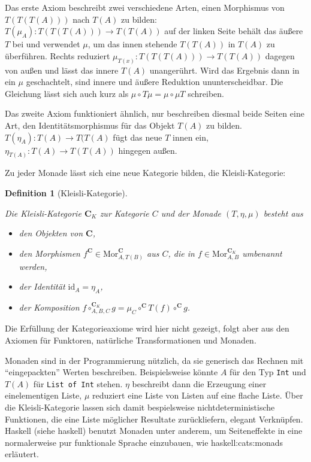 \documentclass[11pt, a4paper, bibgerm]{scrbook}
\newcommand\icode[1]{\lstinline?#1?}
\newcommand\cref{}
\newcommand\sref{}
\newcommand\ato{\rightarrow} %
\newtheorem{defini}{Definition}
\newcommand{\defi}[2]{%
  \begin{defini}[#1]
    \label{def:#1}
    #2
  \end{defini}
}
\newcommand{\seec}[1]{(siehe \cref{#1})}
\begin{document}
Das erste Axiom beschreibt zwei verschiedene Arten, einen Morphismus von
$T(T(T(A)))$ nach $T(A)$ zu bilden: $T(\mu_A):T(T(T(A))) \ato T(T(A))$
auf der linken Seite behält das äußere $T$ bei und verwendet $\mu$, um
das innen stehende $T(T(A))$ in $T(A)$ zu überführen. Rechts reduziert
$\mu_{T(x)}:T(T(T(A))) \ato T(T(A))$ dagegen von außen und lässt das
innere $T(A)$ unangerührt. Wird das Ergebnis dann in ein $\mu$
geschachtelt, sind innere und äußere Reduktion ununterscheidbar. Die
Gleichung lässt sich auch kurz als $\mu \circ T \mu = \mu \circ \mu T$
schreiben.

Das zweite Axiom funktioniert ähnlich, nur beschreiben diesmal beide
Seiten eine Art, den Identitätsmorphismus für das Objekt $T(A)$ zu
bilden. $T(\eta_A):T(A) \ato T(T(A)$ fügt das neue $T$ innen ein,
$\eta_{T(A)}:T(A) \ato T(T(A))$ hingegen außen.

Zu jeder Monade lässt sich eine neue Kategorie bilden, die Kleisli-Kategorie:
\defi{Kleisli-Kategorie}{
Die Kleisli-Kategorie $\mathbf{C}_K$ zur Kategorie $C$ und der
Monade $(T,\eta,\mu)$ besteht aus
\begin{itemize}
\item den Objekten von $\mathbf{C}$,
\item den Morphismen $f^{\mathbf{C}} \in
  \mathrm{Mor}^{\mathbf{C}}_{A,T(B)}$ aus $C$, die in $f \in
  \mathrm{Mor}^{\mathbf{C}_K}_{A,B}$ umbenannt werden,
\item der Identität $\mathrm{id}_A = \eta_A$,
\item der Komposition $f \circ^{\mathbf{C}_K}_{A,B,C} g = \mu_C
  \circ^{\mathbf{C}} T(f) \circ^{\mathbf{C}} g$.
\end{itemize}
}
Die Erfüllung der Kategorieaxiome wird hier nicht gezeigt, folgt aber
aus den Axiomen für Funktoren, natürliche Transformationen und Monaden.

Monaden sind in der Programmierung nützlich, da sie generisch das
Rechnen mit "`eingepackten"' Werten beschreiben. Beispielsweise könnte
$A$ für den Typ \icode{Int} und $T(A)$ für \icode{List of Int}
stehen. $\eta$ beschreibt dann die Erzeugung einer einelementigen Liste,
$\mu$ reduziert eine Liste von Listen auf eine flache Liste. Über die
Kleisli-Kategorie lassen sich damit bespielsweise nichtdeterministische
Funktionen, die eine Liste möglicher Resultate zurückliefern, elegant
Verknüpfen. Haskell \seec{haskell} benutzt Monaden unter
anderem, um Seiteneffekte in eine normalerweise pur funktionale Sprache
einzubauen, wie \sref{haskell:cats:monads} erläutert.
\end{document}
